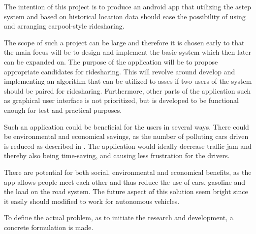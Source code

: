 The intention of this project is to produce an android app that utilizing the \gls{astep} system and based on historical location data should ease the possibility of using and arranging carpool-style ridesharing.

The scope of such a project can be large and therefore it is chosen early to that the main focus will be to design and implement the basic system which then later can be expanded on.
The purpose of the application will be to propose appropriate candidates for ridesharing.
This will revolve around develop and implementing an algorithm that can be utilized to asses if two users of the system should be paired for ridesharing.
Furthermore, other parts of the application such as graphical user interface is not prioritized, but is developed to be functional enough for test and practical purposes.

Such an application could be beneficial for the users in several ways. There could be environmental and economical savings, as the number of polluting cars driven is reduced as described in \cite{doi:10.1080/01441647.2011.621557}. The application would ideally decrease traffic jam and thereby also being time-saving, and causing less frustration for the drivers.

There are potential for both social, environmental and economical benefits, as the app allows people meet each other and thus reduce the use of cars, gasoline and the load on the road system.
The future aspect of this solution seem bright since it easily should modified to work for autonomous vehicles.

To define the actual problem, as to initiate the research and development, a concrete formulation is made.